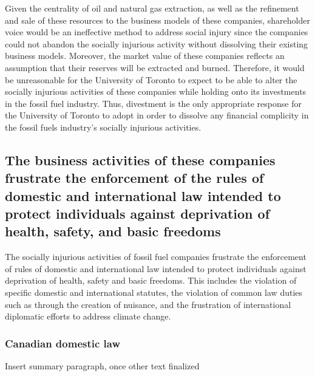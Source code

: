 Given the centrality of oil and natural gas extraction, as well as the refinement and sale of these resources to the business models of these companies, shareholder voice would be an ineffective method to address social injury since the companies could not abandon the socially injurious activity without dissolving their existing business models.  
Moreover, the market value of these companies reflects an assumption that their reserves will be extracted and burned.  
Therefore, it would be unreasonable for the University of Toronto to expect to be able to alter the socially injurious activities of these companies while holding onto its investments in the fossil fuel industry.  
Thus, divestment is the only appropriate response for the University of Toronto to adopt in order to dissolve any financial complicity in the fossil fuels industry’s socially injurious activities.  



	\subsection{The business activities of these companies frustrate the enforcement of the rules of domestic and international law intended to protect individuals against deprivation of health, safety, and basic freedoms}
	\label{sec:FrustrateLaw}



The socially injurious activities of fossil fuel companies frustrate the enforcement of rules of domestic and international law intended to protect individuals against deprivation of health, safety and basic freedoms.  
This includes the violation of specific domestic and international statutes, the violation of common law duties such as through the creation of nuisance, and the frustration of international diplomatic efforts to address climate change.



	\subsubsection{Canadian domestic law}


\begin{vcom}
Insert summary paragraph, once other text finalized
\end{vcom}



